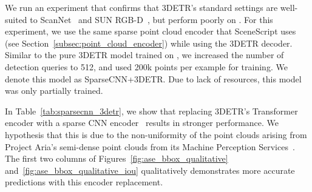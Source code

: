 We run an experiment that confirms that 3DETR's standard settings are well-suited to ScanNet~\cite{dai2017scannet} and SUN RGB-D~\cite{song2015sun}, but perform poorly on \DatasetName{}. For this experiment, we use the same sparse point cloud encoder that SceneScript uses (see Section~\ref{subsec:point_cloud_encoder}) while using the 3DETR decoder. Similar to the pure 3DETR model trained on \DatasetName{}, we increased the number of detection queries to 512, and used 200k points per example for training. We denote this model as SparseCNN+3DETR. Due to lack of resources, this model was only partially trained.

In Table~\ref{tab:sparsecnn_3detr}, we show that replacing 3DETR's Transformer encoder with a sparse CNN encoder~\cite{tang2022torchsparse,tang2020searching} results in stronger performance. We hypothesis that this is due to the non-uniformity of the point clouds arising from Project Aria's semi-dense point clouds from its Machine Perception Services~\cite{AriaMPS2023}. The first two columns of Figures~\ref{fig:ase_bbox_qualitative} and~\ref{fig:ase_bbox_qualitative_iou} qualitatively demonstrates more accurate predictions with this encoder replacement.


